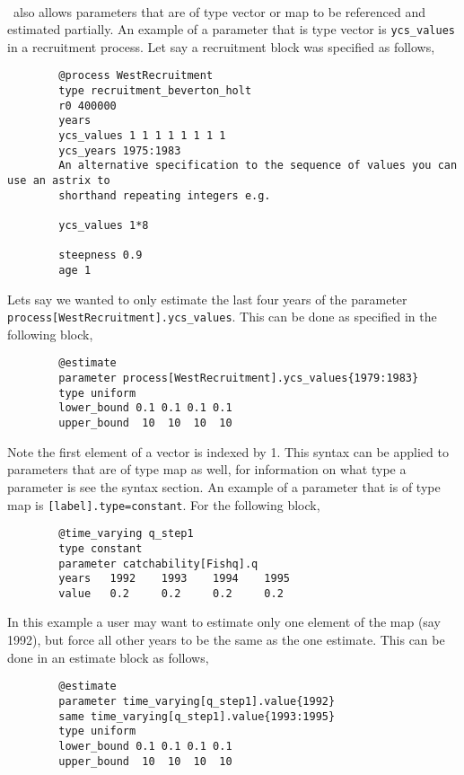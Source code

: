 \paragraph*{\label{sec:params}}
\IBM\ also allows parameters that are of type vector or map to be referenced and estimated partially. An example of a parameter that is type vector is \texttt{ycs\_values} in a recruitment process. Let say a recruitment block was specified as follows,
{\small{\begin{verbatim}
		@process WestRecruitment
		type recruitment_beverton_holt
		r0 400000
		years
		ycs_values 1 1 1 1 1 1 1 1 
		ycs_years 1975:1983
		An alternative specification to the sequence of values you can use an astrix to
		shorthand repeating integers e.g.
		
		ycs_values 1*8
		
		steepness 0.9
		age 1
		\end{verbatim}}}

Lets say we wanted to only estimate the last four years of the parameter \texttt{process[WestRecruitment].ycs\_values}. This can be done as specified in the following  block,

{\small{\begin{verbatim}
		@estimate
		parameter process[WestRecruitment].ycs_values{1979:1983}
		type uniform
		lower_bound 0.1 0.1 0.1 0.1
		upper_bound  10  10  10  10 
		\end{verbatim}}}

Note the first element of a vector is indexed by 1. This syntax can be applied to parameters that are of type map as well, for information on what type a parameter is see the syntax section. An example of a parameter that is of type map is \texttt{[label].type=constant}. For the following  block,

{\small{\begin{verbatim}
		@time_varying q_step1
		type constant
		parameter catchability[Fishq].q
		years 	1992	1993	1994	1995
		value 	0.2		0.2		0.2		0.2	
		\end{verbatim}}}

In this example a user may want to estimate only one element of the map (say 1992), but force all other years to be the same as the one estimate. This can be done in an estimate block as follows,
{\small{\begin{verbatim}
		@estimate
		parameter time_varying[q_step1].value{1992}
		same time_varying[q_step1].value{1993:1995}
		type uniform
		lower_bound 0.1 0.1 0.1 0.1
		upper_bound  10  10  10  10 
		\end{verbatim}}}

